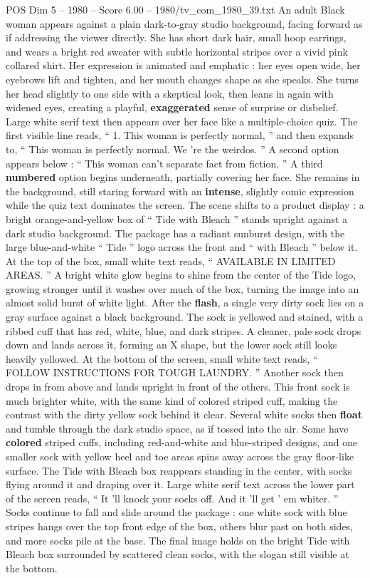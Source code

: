 \begin{textsample}{POS Dim 5 – 1980 – Score 6.00 – 1980/tv\_com\_1980\_39.txt}  \label{ex:f5_pos_037}
An adult Black woman appears against a plain dark-to-gray studio background, facing forward as if addressing the viewer directly.
She has short dark hair, small hoop earrings, and wears a bright red sweater with subtle horizontal stripes over a vivid pink collared shirt.
Her expression is animated and emphatic : her eyes open wide, her eyebrows lift and tighten, and her mouth changes shape as she speaks.
She turns her head slightly to one side with a skeptical look, then leans in again with widened eyes, creating a playful, \textbf{exaggerated} sense of surprise or disbelief.
Large white serif text then appears over her face like a multiple-choice quiz.
The first visible line reads, “ 1.
This woman is perfectly normal, ” and then expands to, “ This woman is perfectly normal.
We ’re the weirdos. ” A second option appears below : “ This woman can't separate fact from fiction. ” A third \textbf{numbered} option begins underneath, partially covering her face.
She remains in the background, still staring forward with an \textbf{intense}, slightly comic expression while the quiz text dominates the screen.
The scene shifts to a product display : a bright orange-and-yellow box of “ Tide with Bleach ” stands upright against a dark studio background.
The package has a radiant sunburst design, with the large blue-and-white “ Tide ” logo across the front and “ with Bleach ” below it.
At the top of the box, small white text reads, “ AVAILABLE IN LIMITED AREAS. ” A bright white glow begins to shine from the center of the Tide logo, growing stronger until it washes over much of the box, turning the image into an almost solid burst of white light.
After the \textbf{flash}, a single very dirty sock lies on a gray surface against a black background.
The sock is yellowed and stained, with a ribbed cuff that has red, white, blue, and dark stripes.
A cleaner, pale sock drops down and lands across it, forming an X shape, but the lower sock still looks heavily yellowed.
At the bottom of the screen, small white text reads, “ FOLLOW INSTRUCTIONS FOR TOUGH LAUNDRY. ” Another sock then drops in from above and lands upright in front of the others.
This front sock is much brighter white, with the same kind of colored striped cuff, making the contrast with the dirty yellow sock behind it clear.
Several white socks then \textbf{float} and tumble through the dark studio space, as if tossed into the air.
Some have \textbf{colored} striped cuffs, including red-and-white and blue-striped designs, and one smaller sock with yellow heel and toe areas spins away across the gray floor-like surface.
The Tide with Bleach box reappears standing in the center, with socks flying around it and draping over it.
Large white serif text across the lower part of the screen reads, “ It ’ll knock your socks off.
And it ’ll get ’ em whiter. ” Socks continue to fall and slide around the package : one white sock with blue stripes hangs over the top front edge of the box, others blur past on both sides, and more socks pile at the base.
The final image holds on the bright Tide with Bleach box surrounded by scattered clean socks, with the slogan still visible at the bottom.

\end{textsample}
